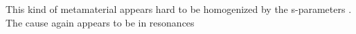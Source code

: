 {This kind of metamaterial appears hard to be homogenized by the s-parameters \cite{wang2010composite}. The cause again appears to be in resonances 






}
